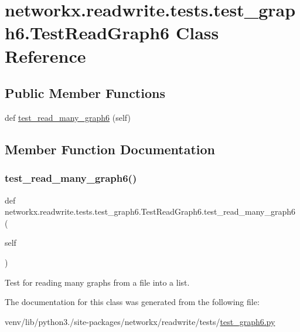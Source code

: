 \hypertarget{classnetworkx_1_1readwrite_1_1tests_1_1test__graph6_1_1TestReadGraph6}{}\section{networkx.\+readwrite.\+tests.\+test\+\_\+graph6.\+Test\+Read\+Graph6 Class Reference}
\label{classnetworkx_1_1readwrite_1_1tests_1_1test__graph6_1_1TestReadGraph6}
\subsection*{Public Member Functions}
\begin{DoxyCompactItemize}
\item 
def \hyperlink{classnetworkx_1_1readwrite_1_1tests_1_1test__graph6_1_1TestReadGraph6_a0efd7ef0f3368159e07cc35494a332a5}{test\+\_\+read\+\_\+many\+\_\+graph6} (self)
\end{DoxyCompactItemize}


\subsection{Member Function Documentation}
\mbox{\label{classnetworkx_1_1readwrite_1_1tests_1_1test__graph6_1_1TestReadGraph6_a0efd7ef0f3368159e07cc35494a332a5}} 
\subsubsection{\texorpdfstring{test\+\_\+read\+\_\+many\+\_\+graph6()}{test\_read\_many\_graph6()}}
{\footnotesize\ttfamily def networkx.\+readwrite.\+tests.\+test\+\_\+graph6.\+Test\+Read\+Graph6.\+test\+\_\+read\+\_\+many\+\_\+graph6 (\begin{DoxyParamCaption}\item[{}]{self }\end{DoxyParamCaption})}

\begin{DoxyVerb}Test for reading many graphs from a file into a list.\end{DoxyVerb}
 

The documentation for this class was generated from the following file\+:\begin{DoxyCompactItemize}
\item 
venv/lib/python3./site-\/packages/networkx/readwrite/tests/\hyperlink{test__graph6_8py}{test\+\_\+graph6.\+py}\end{DoxyCompactItemize}
